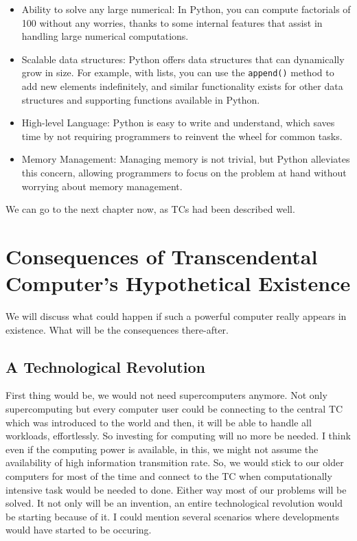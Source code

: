 \documentclass{book}
\begin{document}
\begin{itemize}
    \item Ability to solve any large numerical: In Python, you can compute factorials of 100 without any worries, thanks to some internal features that assist in handling large numerical computations.
    \item Scalable data structures: Python offers data structures that can dynamically grow in size. For example, with lists, you can use the \texttt{append()} method to add new elements indefinitely, and similar functionality exists for other data structures and supporting functions available in Python.
    \item High-level Language: Python is easy to write and understand, which saves time by not requiring programmers to reinvent the wheel for common tasks.
    \item Memory Management: Managing memory is not trivial, but Python alleviates this concern, allowing programmers to focus on the problem at hand without worrying about memory management.
\end{itemize}

We can go to the next chapter now, as TCs had been described well. 

\chapter{Consequences of Transcendental Computer's Hypothetical Existence}

We will discuss what could happen if such a powerful computer really appears in existence. What will be the consequences there-after.

\section{A Technological Revolution}
First thing would be, we would not need supercomputers anymore. Not only supercomputing but every computer user could be connecting to the central TC which was introduced to the world and then, it will be able to handle all workloads, effortlessly. So investing for computing will no more be needed. I think even if the computing power is available, in this, we might not assume the availability of high information transmition rate. So, we would stick to our older computers for most of the time and connect to the TC when computationally intensive task would be needed to done. Either way most of our problems will be solved. It not only will be an invention, an entire technological revolution would be starting because of it.  I could mention several scenarios where developments would have started to be occuring.
\end{document}
